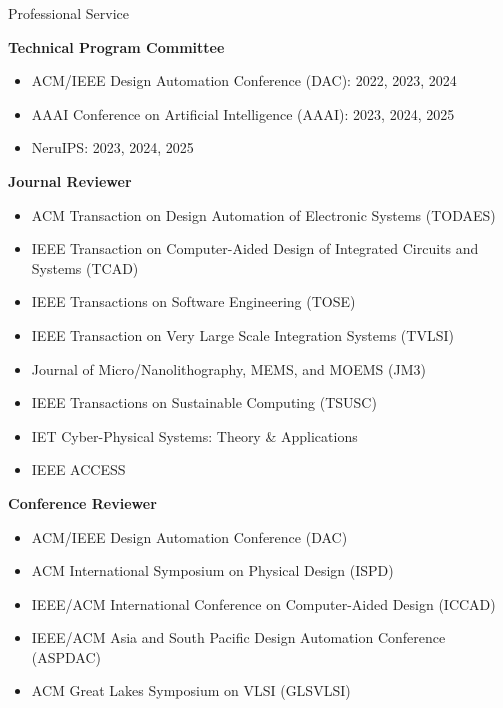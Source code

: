\iftrue
\begin{rSection}{Professional Service}
	
\textbf{Technical Program Committee}
\begin{itemize}
	\item ACM/IEEE Design Automation Conference (DAC): 2022, 2023, 2024
	\item AAAI Conference on Artificial Intelligence (AAAI): 2023, 2024, 2025
	\item NeruIPS: 2023, 2024, 2025
\end{itemize}

\textbf{Journal Reviewer}
\begin{itemize}
    \item ACM Transaction on Design Automation of Electronic Systems (TODAES)
    \item IEEE Transaction on Computer-Aided Design of Integrated Circuits and Systems (TCAD)
    \item IEEE Transactions on Software Engineering (TOSE)
    \item IEEE Transaction on Very Large Scale Integration Systems (TVLSI)
    \item Journal of Micro/Nanolithography, MEMS, and MOEMS (JM3)
    \item IEEE Transactions on Sustainable Computing (TSUSC)
    \item IET Cyber-Physical Systems: Theory \& Applications
    \item IEEE ACCESS
\end{itemize}

\textbf{Conference Reviewer}
\begin{itemize}
    \item ACM/IEEE Design Automation Conference (DAC)
    \item ACM International Symposium on Physical Design (ISPD)
    \item IEEE/ACM International Conference on Computer-Aided Design (ICCAD)
    \item IEEE/ACM Asia and South Pacific Design Automation Conference (ASPDAC)
	\item ACM Great Lakes Symposium on VLSI (GLSVLSI)
\end{itemize}
\end{rSection}
\fi

